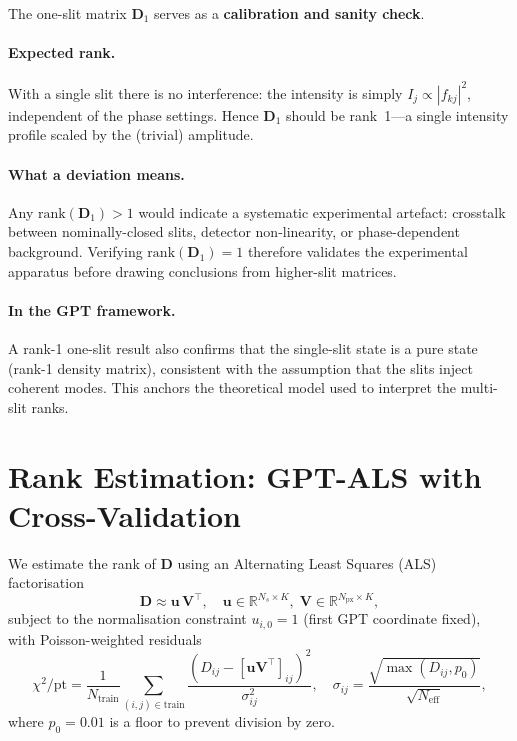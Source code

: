 \documentclass[12pt]{article}
\begin{document}
The one-slit matrix $\mathbf{D}_1$ serves as a \textbf{calibration and sanity check}.

\paragraph{Expected rank.}  With a single slit there is no interference: the
intensity is simply $I_j \propto |f_{kj}|^2$, independent of the phase settings.
Hence $\mathbf{D}_1$ should be rank~1---a single intensity profile scaled by the
(trivial) amplitude.

\paragraph{What a deviation means.}  Any $\mathrm{rank}(\mathbf{D}_1) > 1$ would
indicate a systematic experimental artefact: crosstalk between nominally-closed
slits, detector non-linearity, or phase-dependent background.  Verifying
$\mathrm{rank}(\mathbf{D}_1) = 1$ therefore validates the experimental apparatus
before drawing conclusions from higher-slit matrices.

\paragraph{In the GPT framework.}  A rank-1 one-slit result also confirms that the
single-slit state is a pure state (rank-1 density matrix), consistent with the
assumption that the slits inject coherent modes.  This anchors the theoretical
model used to interpret the multi-slit ranks.

\section{Rank Estimation: GPT-ALS with Cross-Validation}

We estimate the rank of $\mathbf{D}$ using an Alternating Least Squares (ALS)
factorisation
\begin{equation}
    \mathbf{D} \approx \mathbf{u}\,\mathbf{V}^\top, \quad
    \mathbf{u} \in \mathbb{R}^{N_s \times K},\;
    \mathbf{V} \in \mathbb{R}^{N_{\mathrm{px}} \times K},
\end{equation}
subject to the normalisation constraint $u_{i,0} = 1$ (first GPT coordinate fixed),
with Poisson-weighted residuals
\begin{equation}
    \chi^2/\mathrm{pt} = \frac{1}{N_{\mathrm{train}}}
    \sum_{(i,j)\in\mathrm{train}}
    \frac{(D_{ij} - [\mathbf{u}\mathbf{V}^\top]_{ij})^2}{\sigma_{ij}^2},
    \quad
    \sigma_{ij} = \frac{\sqrt{\max(D_{ij}, p_0)}}{\sqrt{N_{\mathrm{eff}}}},
\end{equation}
where $p_0 = 0.01$ is a floor to prevent division by zero.
\end{document}
